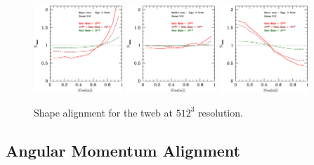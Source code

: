 \documentclass[usenatbib]{mn2e}
\begin{document}
\begin{figure}
\includegraphics[width=0.30\textwidth]{../plot2/Ax1_VT/512_AX1_T3.ps}
\includegraphics[width=0.30\textwidth]{../plot2/Ax2_VT/512_AX2_T2.ps}
\includegraphics[width=0.30\textwidth]{../plot2/Ax3_VT/512_AX3_T3.ps}
\caption{Shape alignment for the tweb at $512^3$ resolution.}
\end{figure}




\newpage
\subsection{Angular Momentum Alignment}
\end{document}

